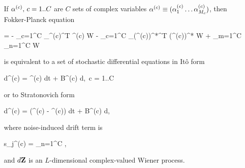\begin{theorem}
\label{thm:fpe-sde:corr:mc-fpe-sde}
	If $\mathbf{\alpha}^{(c)},\, c = 1..C$ are $C$ sets of complex variables $\mathbf{\alpha}^{(c)} \equiv (\alpha_1^{(c)} \ldots \alpha_{M_c}^{(c)})$,
	then Fokker-Planck equation
	\begin{eqn*}
		= - \sum_{c=1}^C \bpartial_{\balpha^{(c)}}^T \avec^{(c)} W
		- \sum_{c=1}^C \bpartial_{(\balpha^{(c)})^*}^T (\avec^{(c)})^* W
		+ \sum_{m=1}^C \sum_{n=1}^C
			 W
	\end{eqn*}
	is equivalent to a set of stochastic differential equations in It\^{o} form
	\begin{eqn*}
		d\balpha^{(c)} = \avec^{(c)} dt + B^{(c)} d\Zvec,\, c = 1..C
	\end{eqn*}
	or to Stratonovich form
	\begin{eqn*}
		d\balpha^{(c)} = (\avec^{(c)} - \svec^{(c)}) dt + B^{(c)} d\Zvec,
	\end{eqn*}
	where noise-induced drift term is
	\begin{eqn*}
		s_j^{(c)} =  \sum_{n=1}^C
			\Trace{ (B^{(n)})^H \bpartial_{(\balpha^{(n)})^*} \evec_j^T B^{(c)} },
	\end{eqn*}
	and $d\mathbf{Z}$ is an $L$-dimensional complex-valued Wiener process.
\end{theorem}
